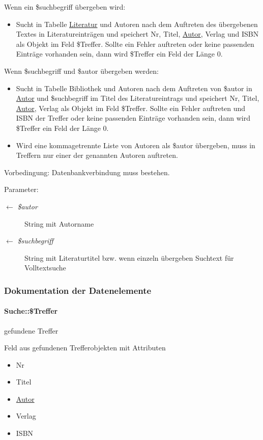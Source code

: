 Wenn ein \$suchbegriff übergeben wird:\begin{itemize}
\item Sucht in Tabelle \hyperlink{classLiteratur}{Literatur} und Autoren nach dem Auftreten des übergebenen Textes in Literatureinträgen und speichert Nr, Titel, \hyperlink{classAutor}{Autor}, Verlag und ISBN als Objekt im Feld \$Treffer. Sollte ein Fehler auftreten oder keine passenden Einträge vorhanden sein, dann wird \$Treffer ein Feld der Länge 0.\end{itemize}


Wenn \$suchbegriff und \$autor übergeben werden:\begin{itemize}
\item Sucht in Tabelle Bibliothek und Autoren nach dem Auftreten von \$autor in \hyperlink{classAutor}{Autor} und \$suchbegriff im Titel des Literatureintrags und speichert Nr, Titel, \hyperlink{classAutor}{Autor}, Verlag als Objekt im Feld \$Treffer. Sollte ein Fehler auftreten und ISBN der Treffer oder keine passenden Einträge vorhanden sein, dann wird \$Treffer ein Feld der Länge 0.\item Wird eine kommagetrennte Liste von Autoren als \$autor übergeben, muss in Treffern nur einer der genannten Autoren auftreten.\end{itemize}


\begin{Desc}
\item[Vorbedingung:]Datenbankverbindung muss bestehen. \end{Desc}
\begin{Desc}
\item[Parameter:]
\begin{description}
\item[\mbox{$\leftarrow$} {\em \$autor}]String mit Autorname \item[\mbox{$\leftarrow$} {\em \$suchbegriff}]String mit Literaturtitel bzw. wenn einzeln übergeben Suchtext für Volltextsuche \end{description}
\end{Desc}


\subsubsection{Dokumentation der Datenelemente}
\hypertarget{classSuche_0ee0e1ffb3f79392915fd39934d7140d}{
\paragraph[\$Treffer]{\setlength{\rightskip}{0pt plus 5cm}Suche::\$Treffer}\hfill}
\label{classSuche_0ee0e1ffb3f79392915fd39934d7140d}


gefundene Treffer 

Feld aus gefundenen Trefferobjekten mit Attributen\begin{itemize}
\item Nr\item Titel\item \hyperlink{classAutor}{Autor}\item Verlag\item ISBN \end{itemize}
